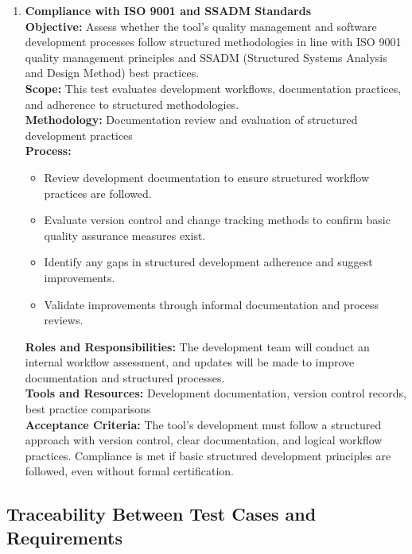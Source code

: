 \documentclass[12pt, titlepage]{article}
\begin{document}
\begin{enumerate}[label={\bf
      \textcolor{Maroon}{test-CPL-\arabic*}}, wide=0pt, font=\itshape]
    \item \textbf{Compliance with ISO 9001 and SSADM Standards} \\[2mm]
      \textbf{Objective:} Assess whether the tool’s quality
      management and software development processes follow structured
      methodologies in line with ISO 9001 quality management
      principles and SSADM (Structured Systems Analysis and Design
      Method) best practices. \\[2mm]
      \textbf{Scope:} This test evaluates development workflows,
      documentation practices, and adherence to structured
      methodologies. \\[2mm]
      \textbf{Methodology:} Documentation review and evaluation of
      structured development practices \\[2mm]
      \textbf{Process:}
      \begin{itemize}
        \item Review development documentation to ensure structured
          workflow practices are followed.
        \item Evaluate version control and change tracking methods to
          confirm basic quality assurance measures exist.
        \item Identify any gaps in structured development adherence
          and suggest improvements.
        \item Validate improvements through informal documentation
          and process reviews.
      \end{itemize}
      \textbf{Roles and Responsibilities:} The development team will
      conduct an internal workflow assessment, and updates will be
      made to improve documentation and structured processes. \\[2mm]
      \textbf{Tools and Resources:} Development documentation,
      version control records, best practice comparisons \\[2mm]
      \textbf{Acceptance Criteria:} The tool's development must
      follow a structured approach with version control, clear
      documentation, and logical workflow practices. Compliance is
      met if basic structured development principles are followed,
      even without formal certification.
  \end{enumerate}

  \subsection{Traceability Between Test Cases and Requirements}
  \label{trace-sys}
\end{document}
